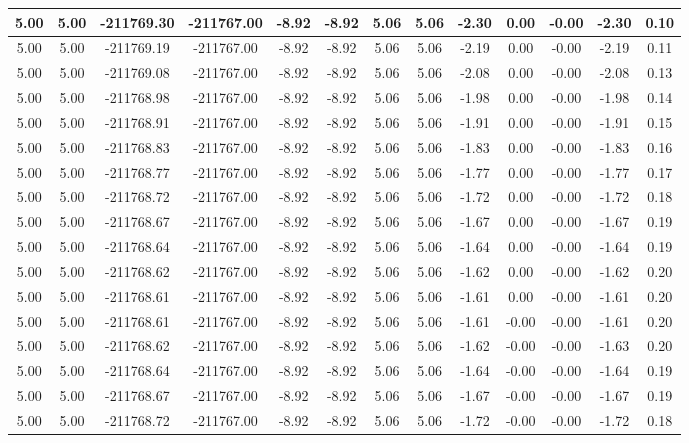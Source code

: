 \begin{table}[htbp]
\begin{adjustbox}{angle=90}
\begin{tabular}{|c|c|c|c|c|c|c|c|c|c|c|c|c|}
 5.00 & 5.00 & -211769.30 & -211767.00 & -8.92 & -8.92 & 5.06 & 5.06 & -2.30 & 0.00 & -0.00 & -2.30 & 0.10\\ \hline
 5.00 & 5.00 & -211769.19 & -211767.00 & -8.92 & -8.92 & 5.06 & 5.06 & -2.19 & 0.00 & -0.00 & -2.19 & 0.11\\ \hline
 5.00 & 5.00 & -211769.08 & -211767.00 & -8.92 & -8.92 & 5.06 & 5.06 & -2.08 & 0.00 & -0.00 & -2.08 & 0.13\\ \hline
 5.00 & 5.00 & -211768.98 & -211767.00 & -8.92 & -8.92 & 5.06 & 5.06 & -1.98 & 0.00 & -0.00 & -1.98 & 0.14\\ \hline
 5.00 & 5.00 & -211768.91 & -211767.00 & -8.92 & -8.92 & 5.06 & 5.06 & -1.91 & 0.00 & -0.00 & -1.91 & 0.15\\ \hline
 5.00 & 5.00 & -211768.83 & -211767.00 & -8.92 & -8.92 & 5.06 & 5.06 & -1.83 & 0.00 & -0.00 & -1.83 & 0.16\\ \hline
 5.00 & 5.00 & -211768.77 & -211767.00 & -8.92 & -8.92 & 5.06 & 5.06 & -1.77 & 0.00 & -0.00 & -1.77 & 0.17\\ \hline
 5.00 & 5.00 & -211768.72 & -211767.00 & -8.92 & -8.92 & 5.06 & 5.06 & -1.72 & 0.00 & -0.00 & -1.72 & 0.18\\ \hline
 5.00 & 5.00 & -211768.67 & -211767.00 & -8.92 & -8.92 & 5.06 & 5.06 & -1.67 & 0.00 & -0.00 & -1.67 & 0.19\\ \hline
 5.00 & 5.00 & -211768.64 & -211767.00 & -8.92 & -8.92 & 5.06 & 5.06 & -1.64 & 0.00 & -0.00 & -1.64 & 0.19\\ \hline
 5.00 & 5.00 & -211768.62 & -211767.00 & -8.92 & -8.92 & 5.06 & 5.06 & -1.62 & 0.00 & -0.00 & -1.62 & 0.20\\ \hline
 5.00 & 5.00 & -211768.61 & -211767.00 & -8.92 & -8.92 & 5.06 & 5.06 & -1.61 & 0.00 & -0.00 & -1.61 & 0.20\\ \hline
 5.00 & 5.00 & -211768.61 & -211767.00 & -8.92 & -8.92 & 5.06 & 5.06 & -1.61 & -0.00 & -0.00 & -1.61 & 0.20\\ \hline
 5.00 & 5.00 & -211768.62 & -211767.00 & -8.92 & -8.92 & 5.06 & 5.06 & -1.62 & -0.00 & -0.00 & -1.63 & 0.20\\ \hline
 5.00 & 5.00 & -211768.64 & -211767.00 & -8.92 & -8.92 & 5.06 & 5.06 & -1.64 & -0.00 & -0.00 & -1.64 & 0.19\\ \hline
 5.00 & 5.00 & -211768.67 & -211767.00 & -8.92 & -8.92 & 5.06 & 5.06 & -1.67 & -0.00 & -0.00 & -1.67 & 0.19\\ \hline
 5.00 & 5.00 & -211768.72 & -211767.00 & -8.92 & -8.92 & 5.06 & 5.06 & -1.72 & -0.00 & -0.00 & -1.72 & 0.18\\ \hline

\end{tabular}
\end{adjustbox}
\end{table}
